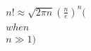 \documentclass[preview]{standalone}
\begin{document}
\begin{align*}
n! \approx \sqrt{2\pi n}(\frac{n}{e})^n ( \\ when \\ n \gg 1 )
\end{align*}
\end{document}
